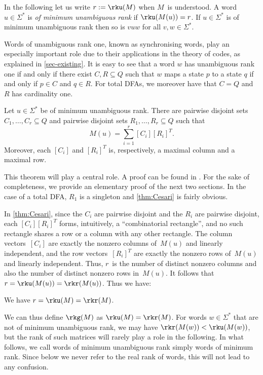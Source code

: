 In the following let us write $r := \rku(M)$ when $M$~is understood.
A word $u \in \Sigma^*$ is \emph{of minimum unambiguous rank} if $\rku(M(u)) = r$.
If $u \in \Sigma^*$ is of minimum unambiguous rank then so is $v u w$ for all $v, w \in \Sigma^*$. 

Words of unambiguous rank one, known as synchronising words, play an especially important role due to their applications in the theory of codes, as explained in \autoref{sec-existing}. It is easy to see that a word $w$ has unambiguous rank one if and only if there exist $C, R \subseteq Q$ such that $w$ maps a state $p$ to a state $q$ if and only if $p \in C$ and $q \in R$.
For total DFAs, we moreover have that $C = Q$ and $R$ has cardinality one.

\begin{thmC} \label{thm:Cesari}
Let $u \in \Sigma^*$ be of minimum unambiguous rank.
There are pairwise disjoint sets $C_1, \ldots, C_r \subseteq Q$ and pairwise disjoint sets $R_1, \ldots, R_r \subseteq Q$ such that \[M(u) = \sum_{i=1}^r [C_i] [R_i]^T.\]
Moreover, each $[C_i]$ and $[R_i]^T$ is, respectively, a maximal column and a maximal row.
\end{thmC}

\noindent
This theorem will play a central role.
A proof can be found in \cite[Proposition 4]{BealCKP08}. For the sake of completeness, we provide an elementary proof of the next two sections.
In the case of a total DFA, $R_1$ is a singleton and \autoref{thm:Cesari} is fairly obvious.



In \autoref{thm:Cesari}, since the $C_i$ are pairwise disjoint and the $R_i$ are pairwise disjoint, each $[C_i] [R_i]^T$ forms, intuitively, a ``combinatorial rectangle'', and no such rectangle shares a row or a column with any other rectangle.
The column vectors~$[C_i]$ are exactly the nonzero columns of~$M(u)$ and linearly independent, and the row vectors~$[R_i]^T$ are exactly the nonzero rows of~$M(u)$ and linearly independent.
Thus, $r$~is the number of distinct nonzero columns and also the number of distinct nonzero rows in~$M(u)$.
It follows that $r = \rku(M(u)) = \rkr(M(u))$. Thus we have:

\begin{cor} \label{cor:ranks-equal}
We have $r = \rku(M) = \rkr(M)$.
\end{cor}

\noindent
We can thus define $\rkg(M)$ as $\rku(M) = \rkr(M)$.
For words $w \in \Sigma^*$ that are not of minimum unambiguous rank, we may have $\rkr(M(w)) < \rku(M(w))$, but the rank of such matrices will rarely play a role in the following. In what follows, we call words of minimum unambiguous rank simply words of minimum rank. Since below we never refer to the real rank of words, this will not lead to any confusion.

